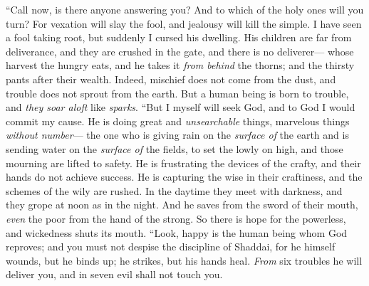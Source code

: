 \begin{biblechapter} %
 “Call now, is there anyone answering you? 
And to which of the holy ones will you turn?
\verse For vexation will slay the fool, 
and jealousy will kill the simple.
\verse I have seen a fool taking root, 
but suddenly I cursed his dwelling.
\verse His children are far from deliverance, 
and they are crushed in the gate, 
and there is no deliverer—
\verse whose harvest the hungry eats, 
and he takes it \textit{from behind} the thorns; 
and the thirsty pants after their wealth.
\verse Indeed, mischief does not come from the dust, 
and trouble does not sprout from the earth.
\verse But a human being is born to trouble, 
and \textit{they soar aloft} like \textit{sparks}.
\verse “But I myself will seek God, 
and to God I would commit my cause.
\verse He is doing great and \textit{unsearchable} things, 
marvelous things \textit{without number}—
\verse the one who is giving rain on the \textit{surface of} the earth 
and is sending water on the \textit{surface of} the fields,
\verse to set the lowly on high, 
and those mourning are lifted to safety.
\verse He is frustrating the devices of the crafty, 
and their hands do not achieve success.
\verse He is capturing the wise in their craftiness, 
and the schemes of the wily are rushed.
\verse In the daytime they meet with darkness, 
and they grope at noon as in the night.
\verse And he saves from the sword of their mouth, 
\textit{even} the poor from the hand of the strong.
\verse So there is hope for the powerless, 
and wickedness shuts its mouth.
\verse “Look, happy is the human being whom God reproves; 
and you must not despise the discipline of Shaddai,
\verse for he himself wounds, but he binds up; 
he strikes, but his hands heal.
\verse \textit{From} six troubles he will deliver you, 
and in seven evil shall not touch you.

\end{biblechapter}
